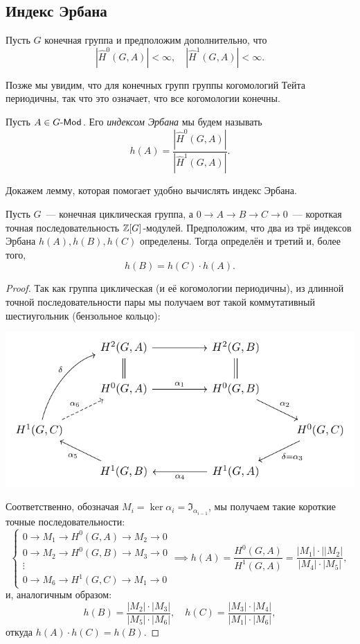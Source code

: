 	\subsection{Индекс Эрбана}

	Пусть $G$ конечная группа и предположим дополнительно, что 
	\[
		|\widehat{H}^0(G, A)| < \infty, \quad |\widehat{H}^1(G, A)| < \infty.
	\]
	\begin{remark}
		Позже мы увидим, что для конечных групп группы когомологий Тейта периодичны, так что это означает, что все когомологии конечны. 
	\end{remark}

	\begin{definition} 
		Пусть $A \in G\text{-}\mathsf{Mod}$. Его \emph{индексом Эрбана} мы будем называть  
		\[
			h(A) = \frac{|\widehat{H}^0(G, A)|}{|\widehat{H}^1(G, A)|}.
		\]
	\end{definition}

	Докажем лемму, которая помогает удобно вычислять индекс Эрбана. 

	\begin{statement}\label{Herbran_calculation} 
		Пусть $G$~--- конечная  циклическая группа, а $0 \to A \to B \to C \to 0$~--- короткая точная последовательность $\mathbb{Z}[G]$-модулей. Предположим, что два из трё индексов Эрбана $h(A), h(B), h(C)$ определены. Тогда определён и третий и, более того, 
		\[
			h(B) = h(C) \cdot h(A).
		\]
	\end{statement}
	\begin{proof}
		Так как группа циклическая (и её когомологии периодичны), из длинной точной последовательности пары мы получаем вот такой коммутативный шестиугольник (бензольное кольцо): 
		\begin{center}
			\includegraphics{lectures/6/pictures/cd_20.pdf}
		\end{center}

		Соответственно, обозначая $M_i = \ker{\alpha_i} = \Im_{\alpha_{i - 1}}$, мы получаем такие короткие точные последовательности: 
		\[
			\begin{cases} 0 \to M_1 \to H^0(G, A) \to M_2 \to 0  \\ 0 \to M_2 \to H^0(G, B) \to M_3 \to 0 \\ \vdots \\ 0 \to M_6 \to H^1(G, C) \to M_1 \to 0\end{cases} \implies h(A) = \frac{H^0(G, A)}{H^1(G, A)} = \frac{|M_1| \cdot ||M_2|}{|M_4| \cdot |M_5|}, \ 
		\]
		и, аналогичным образом: 
		\[
			h(B) = \frac{|M_2| \cdot |M_3|}{|M_5| \cdot |M_6|}, \quad h(C)  = \frac{|M_3| \cdot |M_4|}{|M_1| \cdot |M_6|}, 
		\]
		откуда $h(A) \cdot h(C) = h(B)$. 
	\end{proof}	

